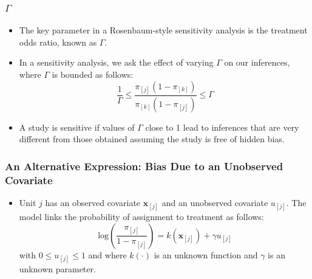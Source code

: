 \documentclass{beamer}
\begin{document}
\begin{frame}
  \frametitle{$\Gamma$}
  \begin{itemize}
  \item<+-> The key parameter in a Rosenbaum-style sensitivity analysis is
    the treatment odds ratio, known as $\Gamma$.
  \item<+-> In a sensitivity analysis, we ask the effect of varying
    $\Gamma$ on our inferences, where $\Gamma$ is bounded as follows:
$$
\frac{1}{\Gamma} \leq
\frac{\pi_{[j]}(1-\pi_{[k]})}{\pi_{[k]}(1-\pi_{[j]})} \leq \Gamma
$$
\item<+-> A study is sensitive if values of $\Gamma$ close to 1 lead to
  inferences that are very different from those obtained assuming the
  study is free of hidden bias. 
  \end{itemize}
\end{frame}

\begin{frame}
  \frametitle{An Alternative Expression: Bias Due to an Unobserved Covariate}
  \begin{itemize}
  \item<+-> Unit $j$ has an observed covariate $\mathbf{x}_{[j]}$ and an
    unobserved covariate $u_{[j]}$. The model links the probability of
    assignment to treatment as follows:
$$\textrm{log}\left(\frac{\pi_{[j]}}{1- \pi_{[j]}} \right)=
k(\mathbf{x}_{[j]})+\gamma u_{[j]}$$ with $0\leq u_{[j]} \leq 1$ and
where $k(\cdot)$ is an unknown function and $\gamma$ is an unknown
parameter. 

  \end{itemize}
\end{frame}
\end{document}
